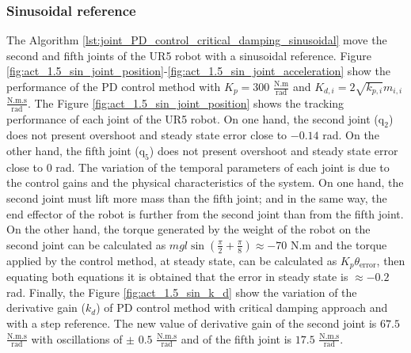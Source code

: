 \subsubsection{Sinusoidal reference}
The Algorithm \ref{lst:joint_PD_control_critical_damping_sinusoidal} move the second and fifth joints of the UR5 robot with a sinusoidal reference. Figure \ref{fig:act_1.5_sin_joint_position}-\ref{fig:act_1.5_sin_joint_acceleration} show the performance of the PD control method with $K_p=300$ $\mathrm{\frac{N.m}{rad}}$ and $K_{d,i}=2 \sqrt{k_{p,i}} m_{i,i}$ $\mathrm{\frac{N.m.s}{rad}}$. The Figure \ref{fig:act_1.5_sin_joint_position} shows the tracking performance of each joint of the UR5 robot. On one hand, the second joint ($\mathrm{q}_2$) does not present overshoot and steady state error close to $-0.14$ rad. On the other hand, the fifth joint ($\mathrm{q}_5$) does not present overshoot and steady state error close to $0$ rad. The variation of the temporal parameters of each joint is due to the control gains and the physical characteristics of the system. On one hand, the second joint must lift more mass than the fifth joint; and in the same way, the end effector of the robot is further from the second joint than from the fifth joint. On the other hand, the torque generated by the weight of the robot on the second joint can be calculated as $m g l \sin({\frac{\pi}{2} + \frac{\pi}{8}}) \approx -70$ N.m and the torque applied by the control method, at steady state, can be calculated as $K_p \theta_{\mathrm{error}}$, then equating both equations it is obtained that the error in steady state is $\approx -0.2$ rad. Finally, the Figure \ref{fig:act_1.5_sin_k_d} show the variation of the derivative gain ($k_d$) of PD control method with critical damping approach and with a step reference. The new value of derivative gain of the second joint is $67.5$ $\mathrm{\frac{N.m.s}{rad}}$ with oscillations of $\pm$ $0.5$ $\mathrm{\frac{N.m.s}{rad}}$ and of the fifth joint is $17.5$ $\mathrm{\frac{N.m.s}{rad}}$.  

